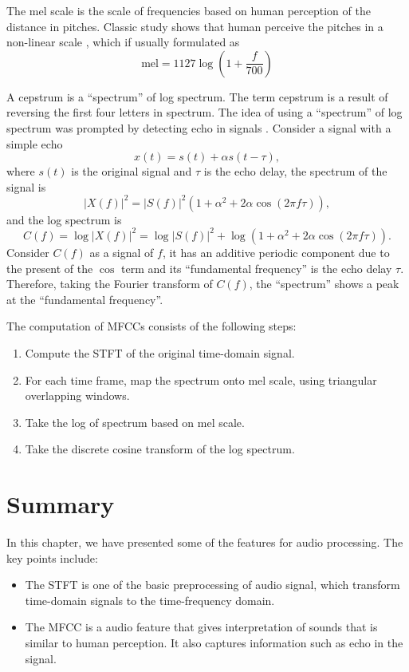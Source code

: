 \documentclass[12pt,final,twoside]{report}
\theoremstyle{plain}
\theoremstyle{definition}
\theoremstyle{remark}
\begin{document}
The mel scale is the scale of frequencies based on human perception of the distance in pitches. Classic study shows that human perceive the pitches in a non-linear scale \cite{stevens_scale_1937}, which if usually formulated as \cite{oshaughnessy_speech_1987}
\begin{equation}
  \text{mel} = 1127 \log (1 + \frac{f}{700})
\end{equation}

A cepstrum is a ``spectrum'' of log spectrum. The term cepstrum is a result of reversing the first four letters in spectrum. The idea of using a ``spectrum'' of log spectrum was prompted by detecting echo in signals \cite{oppenheim_frequency_2004}. Consider a signal with a simple echo
\begin{equation}
  x(t) = s(t) + \alpha s(t - \tau),
\end{equation}
where $s(t)$ is the original signal and $\tau$ is the echo delay, the spectrum of the signal is
\begin{equation}
  \left| X(f) \right|^2 = \left| S(f) \right|^2 (1 + \alpha^2 + 2 \alpha \cos(2 \pi f \tau)),
\end{equation}
and the log spectrum is
\begin{equation}
  C(f) = \log \left| X(f) \right|^2 = \log \left| S(f) \right|^2 + \log (1 + \alpha^2 + 2 \alpha \cos(2 \pi f \tau)).
\end{equation}
Consider $C(f)$ as a signal of $f$, it has an additive periodic component due to the present of the $\cos$ term and its ``fundamental frequency'' is the echo delay $\tau$. Therefore, taking the Fourier transform of $C(f)$, the ``spectrum'' shows a peak at the ``fundamental frequency''. 

The computation of MFCCs consists of the following steps:
\begin{enumerate}
  \item Compute the STFT of the original time-domain signal.
  \item For each time frame, map the spectrum onto mel scale, using triangular overlapping windows.
  \item Take the log of spectrum based on mel scale.
  \item Take the discrete cosine transform of the log spectrum.
\end{enumerate}

\section{Summary}
In this chapter, we have presented some of the features for audio processing. The key points include:
\begin{itemize}
  \item The STFT is one of the basic preprocessing of audio signal, which transform time-domain signals to the time-frequency domain.
  \item The MFCC is a audio feature that gives interpretation of sounds that is similar to human perception. It also captures information such as echo in the signal.
\end{itemize}
\end{document}
